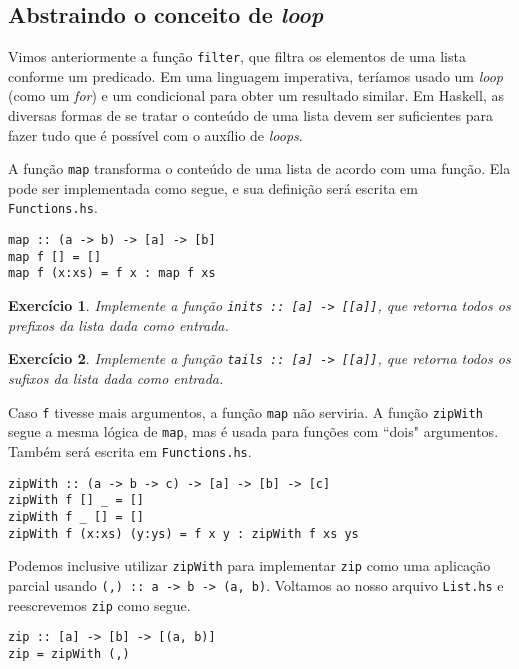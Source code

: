 \documentclass[a4paper]{article}
\newtheorem{exercicio}{Exercício}
\begin{document}
\subsection{Abstraindo o conceito de \emph{loop}}

Vimos anteriormente a função \texttt{filter}, que filtra os elementos de uma lista conforme um predicado.
Em uma linguagem imperativa, teríamos usado um \emph{loop} (como um \emph{for}) e um condicional para obter um resultado similar.
Em Haskell, as diversas formas de se tratar o conteúdo de uma lista devem ser suficientes para fazer tudo que é possível com o auxílio de \emph{loops}.

A função \texttt{map} transforma o conteúdo de uma lista de acordo com uma função.
Ela pode ser implementada como segue, e sua definição será escrita em \texttt{Functions.hs}.

\begin{verbatim}
map :: (a -> b) -> [a] -> [b]
map f [] = []
map f (x:xs) = f x : map f xs
\end{verbatim}

\begin{exercicio}
	Implemente a função \emph{\texttt{inits :: [a] -> [[a]]}}, que retorna todos os prefixos da lista dada como entrada.
\end{exercicio}

\begin{exercicio}
	Implemente a função \emph{\texttt{tails :: [a] -> [[a]]}}, que retorna todos os sufixos da lista dada como entrada.
\end{exercicio}

Caso \texttt{f} tivesse mais argumentos, a função \texttt{map} não serviria.
A função \texttt{zipWith} segue a mesma lógica de \texttt{map}, mas é usada para funções com ``dois" argumentos.
Também será escrita em \texttt{Functions.hs}.

\begin{verbatim}
zipWith :: (a -> b -> c) -> [a] -> [b] -> [c]
zipWith f [] _ = []
zipWith f _ [] = []
zipWith f (x:xs) (y:ys) = f x y : zipWith f xs ys
\end{verbatim}

Podemos inclusive utilizar \texttt{zipWith} para implementar \texttt{zip} como uma aplicação parcial usando \texttt{(,) :: a -> b -> (a, b)}.
Voltamos ao nosso arquivo \texttt{List.hs} e reescrevemos \texttt{zip} como segue.

\begin{verbatim}
zip :: [a] -> [b] -> [(a, b)]
zip = zipWith (,)
\end{verbatim}
\end{document}
